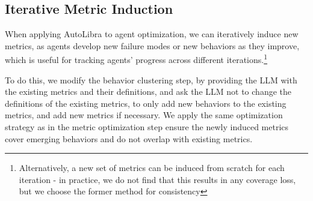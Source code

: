 \subsection{Iterative Metric Induction}
\label{sec:iterative-induction} When applying AutoLibra to agent optimization, we
can iteratively induce new metrics, as agents develop new failure modes or new
behaviors as they improve, which is useful for tracking agents' progress across
different iterations.\footnote{Alternatively, a new set of metrics can be induced
	from scratch for each iteration - in practice, we do not find that this results
	in any coverage loss, but we choose the former method for consistency}


To do this, we modify the behavior clustering step, by providing the LLM with
the existing metrics and their definitions, and ask the LLM not to change the definitions
of the existing metrics, to only add new behaviors to the existing metrics, and add
new metrics if necessary. We apply the same optimization strategy as in the
metric optimization step ensure the newly induced metrics cover emerging
behaviors and do not overlap with existing metrics.

